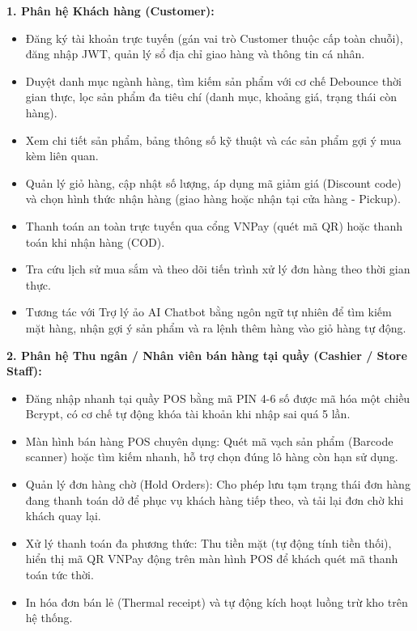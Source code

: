 \documentclass[12pt,a4paper]{report}
\begin{document}
\textbf{1. Phân hệ Khách hàng (Customer):}
\begin{itemize}[leftmargin=1.5cm]
    \item Đăng ký tài khoản trực tuyến (gán vai trò Customer thuộc cấp toàn chuỗi), đăng nhập JWT, quản lý sổ địa chỉ giao hàng và thông tin cá nhân.
    \item Duyệt danh mục ngành hàng, tìm kiếm sản phẩm với cơ chế Debounce thời gian thực, lọc sản phẩm đa tiêu chí (danh mục, khoảng giá, trạng thái còn hàng).
    \item Xem chi tiết sản phẩm, bảng thông số kỹ thuật và các sản phẩm gợi ý mua kèm liên quan.
    \item Quản lý giỏ hàng, cập nhật số lượng, áp dụng mã giảm giá (Discount code) và chọn hình thức nhận hàng (giao hàng hoặc nhận tại cửa hàng - Pickup).
    \item Thanh toán an toàn trực tuyến qua cổng VNPay (quét mã QR) hoặc thanh toán khi nhận hàng (COD).
    \item Tra cứu lịch sử mua sắm và theo dõi tiến trình xử lý đơn hàng theo thời gian thực.
    \item Tương tác với Trợ lý ảo AI Chatbot bằng ngôn ngữ tự nhiên để tìm kiếm mặt hàng, nhận gợi ý sản phẩm và ra lệnh thêm hàng vào giỏ hàng tự động.
\end{itemize}

\textbf{2. Phân hệ Thu ngân / Nhân viên bán hàng tại quầy (Cashier / Store Staff):}
\begin{itemize}[leftmargin=1.5cm]
    \item Đăng nhập nhanh tại quầy POS bằng mã PIN 4-6 số được mã hóa một chiều Bcrypt, có cơ chế tự động khóa tài khoản khi nhập sai quá 5 lần.
    \item Màn hình bán hàng POS chuyên dụng: Quét mã vạch sản phẩm (Barcode scanner) hoặc tìm kiếm nhanh, hỗ trợ chọn đúng lô hàng còn hạn sử dụng.
    \item Quản lý đơn hàng chờ (Hold Orders): Cho phép lưu tạm trạng thái đơn hàng đang thanh toán dở để phục vụ khách hàng tiếp theo, và tải lại đơn chờ khi khách quay lại.
    \item Xử lý thanh toán đa phương thức: Thu tiền mặt (tự động tính tiền thối), hiển thị mã QR VNPay động trên màn hình POS để khách quét mã thanh toán tức thời.
    \item In hóa đơn bán lẻ (Thermal receipt) và tự động kích hoạt luồng trừ kho trên hệ thống.
\end{itemize}
\end{document}
